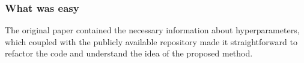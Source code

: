 


\subsubsection*{What was easy}
The original paper contained the necessary information about hyperparameters, which coupled with the publicly available repository made it straightforward to refactor the code and understand the idea of the proposed method. \vspace{-1mm}


